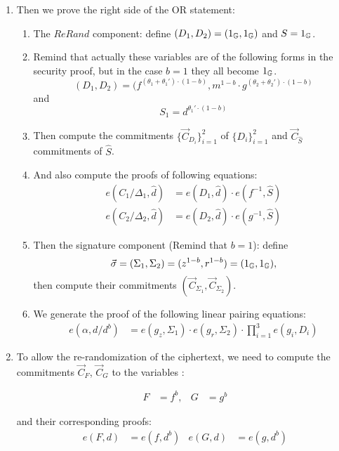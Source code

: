 \begin{description}
\begin{enumerate}
  \item Then we prove the right side of the OR statement:
    \begin{enumerate}  
    \item The $ReRand$ component: define $(D_1, D_2) = (1_{\mathbb{G}}, 1_{\mathbb{G}})$ and $S = 1_{\mathbb{G}}$.
    \item Remind that actually these variables are of the following forms in the security proof, but in the case $b=1$ they all become $1_{\mathbb{G}}$.
      $$(D_1, D_2) = (f^{(\theta_1+\theta_1')\cdot (1-b)}, m^{1-b} \cdot g^{(\theta_2+\theta_2')\cdot (1-b)}$$
      and $$S_1 = d^{\theta_1'\cdot (1-b)}$$
    \item Then compute the commitments $\{\vec{C}_{D_i}\}_{i=1}^2$ of $\{D_i\}_{i= 1}^2$ and $\vec{C}_{\hat{S}}$ commitments of $\hat{S}$.
    \item And also compute the proofs of following equations:
      \begin{align}
        e(C_1/\boxed{\Delta_1}, \hat{d}) &= e (\boxed{D_1}, \hat{d}) \cdot e(f^{-1}, \boxed{\hat{S}}) \tag{7}\\
        e(C_2/\boxed{\Delta_2}, \hat{d}) &= e (\boxed{D_2}, \hat{d}) \cdot e(g^{-1}, \boxed{\hat{S}}) \tag{8}
      \end{align}

    \item Then the signature component (Remind that $b = 1$): define
      $$\vec{\sigma}  = (\Sigma_1, \Sigma_2) = (z^{1-b}, r^{1-b}) = (1_{\mathbb{G}}, 1_{\mathbb{G}}),$$
      then compute their commitments $(\vec{C}_{\Sigma_1}, \vec{C}_{\Sigma_2})$.
    \item We generate the proof of the following linear pairing equations:
      \begin{align} 
        e(\alpha, d/\boxed{d^b}) &= e(g_z, \boxed{\Sigma_1}) \cdot e(g_r, \boxed{\Sigma_2}) \cdot \prod_{i=1}^3 e(g_i, \boxed{D_i}) \tag{9}
      \end{align}

    \end{enumerate}

  \item To allow the re-randomization of the ciphertext, we need to compute the commitments $\vec{C}_F$, $\vec{C}_G$ to the variables :

    \begin{align*}
    F &= f^b, & G&=g^b
    \end{align*}

    and their corresponding proofs:
    \begin{align}
      e(\boxed{F},d) &= e(f,\boxed{d^b}) & e(\boxed{G}, d) &= e(g, \boxed{d^b})\tag{10,11}
    \end{align}


\end{enumerate}
\end{description}
